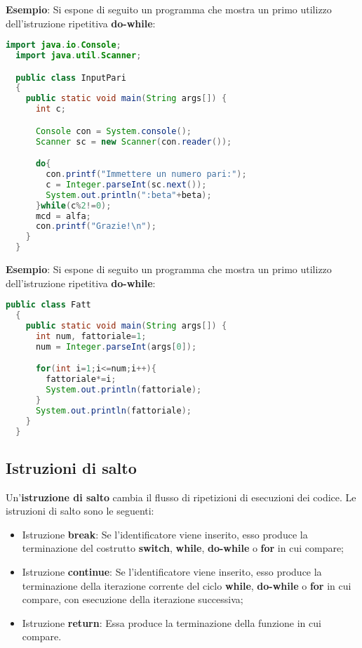 \documentclass[a4paper]{extarticle}
\begin{document}
\vspace{1em}
\noindent
\textbf{Esempio}: Si espone di seguito un programma che mostra un primo utilizzo dell'istruzione ripetitiva \textbf{do-while}:

\vspace{1em}
\noindent
\begin{lstlisting}[language=Java, caption=Istruzione ripetitiva do-while in Java]
  import java.io.Console;
  import java.util.Scanner;

  public class InputPari
  {
    public static void main(String args[]) {
      int c;

      Console con = System.console();
      Scanner sc = new Scanner(con.reader());

      do{
        con.printf("Immettere un numero pari:");
        c = Integer.parseInt(sc.next());
        System.out.println(":beta"+beta);
      }while(c%2!=0);
      mcd = alfa;
      con.printf("Grazie!\n");
    }
  }
\end{lstlisting}

\vspace{1em}
\noindent
\textbf{Esempio}: Si espone di seguito un programma che mostra un primo utilizzo dell'istruzione ripetitiva \textbf{do-while}:

\vspace{1em}
\noindent
\begin{lstlisting}[language=Java, caption=Istruzione ripetitiva for in Java]
  public class Fatt
  {
    public static void main(String args[]) {
      int num, fattoriale=1;
      num = Integer.parseInt(args[0]);

      for(int i=1;i<=num;i++){
        fattoriale*=i;
        System.out.println(fattoriale);
      }
      System.out.println(fattoriale);
    }
  }
\end{lstlisting}

\vspace{1em}
\subsection{Istruzioni di salto}
Un'\textbf{istruzione di salto} cambia il flusso di ripetizioni di esecuzioni dei codice. Le istruzioni di salto sono le seguenti:
\begin{itemize}
  \item Istruzione \textbf{break}: Se l’identificatore viene inserito, esso produce la terminazione del costrutto \textbf{switch}, \textbf{while}, \textbf{do-while} o \textbf{for} in cui compare;
  \item Istruzione \textbf{continue}: Se l’identificatore viene inserito, esso produce la terminazione della iterazione corrente del ciclo \textbf{while}, \textbf{do-while} o \textbf{for} in cui compare, con esecuzione della iterazione successiva;
  \item Istruzione \textbf{return}: Essa produce la terminazione della funzione in cui compare.
\end{itemize}
\end{document}
